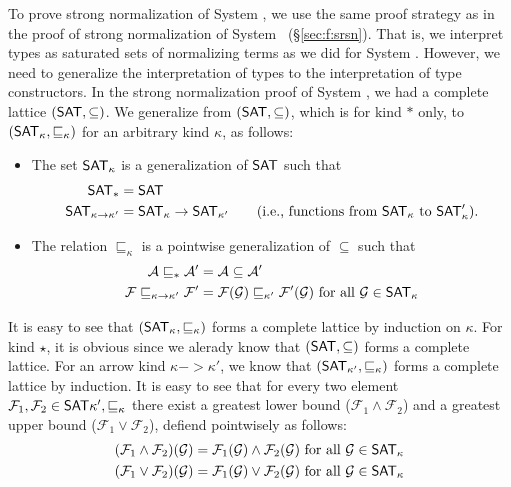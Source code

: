 To prove strong normalization of System \F, we use the same proof strategy
as in the proof of strong normalization of System \F\ (\S\ref{sec:f:srsn}).
That is, we interpret types as saturated sets of normalizing terms as we did
for System \F. However, we need to generalize the interpretation of types to
the interpretation of type constructors. In the strong normalization proof of
System \F, we had a complete lattice $(\mathsf{SAT},\subseteq)$. We generalize from
$(\mathsf{SAT},\subseteq)$, which is for kind $*$ only, to
$(\mathsf{SAT}_\kappa,\sqsubseteq_\kappa)$ for an arbitrary kind $\kappa$,
as follows:
\begin{itemize}
\item The set $\mathsf{SAT}_\kappa$ is a generalization of $\mathsf{SAT}$ such that
\begin{align*}
        \mathsf{SAT}_{*} &= \mathsf{SAT} \\
        \mathsf{SAT}_{\kappa -> \kappa'} &= \mathsf{SAT}_\kappa -> \mathsf{SAT}_{\kappa'}
        \qquad \text{({i.e.}, functions from $\mathsf{SAT}_\kappa$ to $\mathsf{SAT}_\kappa'$)}.
\end{align*}

\item The relation $\sqsubseteq_\kappa$ is
        a pointwise generalization of $\subseteq$ such that
\begin{align*}
\mathcal{A} \sqsubseteq_{*} \mathcal{A'} &= \mathcal{A} \subseteq \mathcal{A'}\\
\mathcal{F} \sqsubseteq_{\kappa -> \kappa'} \mathcal{F'} &=
        \mathcal{F}(\mathcal{G}) \sqsubseteq_{\kappa'} \mathcal{F'}(\mathcal{G})
        ~\text{for all}~\mathcal{G}\in\mathsf{SAT}_\kappa
\end{align*}
\end{itemize}
It is easy to see that $(\mathsf{SAT}_\kappa,\sqsubseteq_\kappa)$ forms
a complete lattice by induction on $\kappa$. For kind $\star$,
it is obvious since we alerady know that $(\mathsf{SAT},\subseteq)$ forms
a complete lattice. For an arrow kind $\kappa -> \kappa'$, we know that
$(\mathsf{SAT}_{\kappa'},\sqsubseteq_{\kappa})$ forms a complete lattice by induction.
It is easy to see that for every two element $\mathcal{F}_1, \mathcal{F}_2
\in \mathsf{SAT}{\kappa'},\sqsubseteq_{\kappa}$ there exist a greatest lower bound
($\mathcal{F}_1 \wedge \mathcal{F}_2$) and a greatest upper bound 
($\mathcal{F}_1 \vee \mathcal{F}_2$), defiend pointwisely as follows:
\begin{align*}
(\mathcal{F}_1 \wedge \mathcal{F}_2)(\mathcal{G}) &=
   \mathcal{F}_1(\mathcal{G}) \wedge \mathcal{F}_2(\mathcal{G})
        ~\text{for all}~\mathcal{G}\in\mathsf{SAT}_\kappa \\
(\mathcal{F}_1 \vee \mathcal{F}_2)(\mathcal{G}) &=
   \mathcal{F}_1(\mathcal{G}) \vee \mathcal{F}_2(\mathcal{G})
        ~\text{for all}~\mathcal{G}\in\mathsf{SAT}_\kappa
\end{align*}
